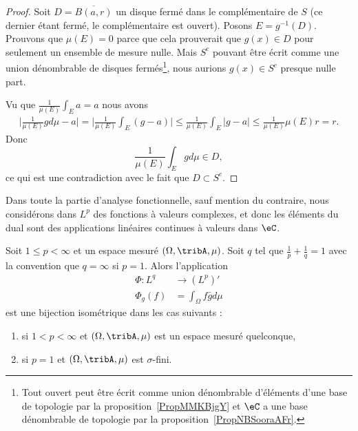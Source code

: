 \begin{proof}
    Soit \( D=\overline{ B(a,r) }\) un disque fermé dans le complémentaire de \( S\) (ce dernier étant fermé, le complémentaire est ouvert). Posons \( E=g^{-1}(D)\). Prouvons que \( \mu(E)=0\) parce que cela prouverait que \( g(x)\in D\) pour seulement un ensemble de mesure nulle. Mais \( S^c\) pouvant être écrit comme une union dénombrable de disques fermés\footnote{Tout ouvert peut être écrit comme union dénombrable d'éléments d'une base de topologie par la proposition~\ref{PropMMKBjgY} et $\eC$ a une base dénombrable de topologie par la proposition~\ref{PropNBSooraAFr}.}, nous aurions \( g(x)\in S^c\) presque nulle part.

    Vu que \( \frac{1}{ \mu(E) }\int_Ea=a\) nous avons
    \begin{subequations}
        \begin{align}
            \big| \frac{1}{ \mu(E) }gd\mu-a \big|=\big| \frac{1}{ \mu(E) }\int_E(g-a) \big|\leq  \frac{1}{ \mu(E) }\int_E| g-a |\leq\frac{1}{ \mu(E) }\mu(E)r=r.
        \end{align}
    \end{subequations}
    Donc
    \begin{equation}
        \frac{1}{ \mu(E) }\int_Egd\mu\in D,
    \end{equation}
    ce qui est une contradiction avec le fait que \( D\subset S^c\).
\end{proof}

Dans toute la partie d'analyse fonctionnelle, sauf mention du contraire, nous considérons dans \( L^p\) des fonctions à valeurs complexes, et donc les éléments du dual sont des applications linéaires continues à valeurs dans \( \eC\).

\begin{theorem}  \label{ThoLPQPooPWBXuv}
    Soit \( 1\leq p<\infty\) et un espace mesuré \( (\Omega,\tribA,\mu)\). Soit \( q\) tel que \( \frac{1}{ p }+\frac{1}{ q }=1\) avec la convention que \( q=\infty\) si \( p=1\). Alors l'application
    \begin{equation}
        \begin{aligned}
            \Phi\colon L^q&\to (L^p)' \\
            \Phi_g(f)&=\int_{\Omega}f\bar gd\mu
        \end{aligned}
    \end{equation}
    est une bijection isométrique dans les cas suivants :
    \begin{enumerate}
        \item       \label{ITEMooSQQBooWSFBmX}
            si \( 1<p<\infty\) et \( (\Omega,\tribA,\mu)\) est un espace mesuré quelconque,
        \item       \label{ITEMooCQGJooOWzjoV}
            si \( p=1\) et \( (\Omega,\tribA, \mu)\) est \( \sigma\)-fini.
    \end{enumerate}
\end{theorem}

